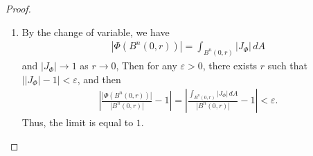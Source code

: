 \documentclass[11pt]{article}
\theoremstyle{definition}
\theoremstyle{definition}
\begin{document}
\begin{proof}
\begin{enumerate}[label=(\alph*)]
    \item By the change of variable, we have
    \begin{align*}
        \left|\Phi(B^n(0,r))\right| = \int_{B^n(0,r)} |J_\Phi|\, dA
    \end{align*}
    and $|J_\Phi| \to 1$ as $r \to 0$, Then for any $\varepsilon > 0$, there exists $r$ such that $\left||J_\Phi| - 1\right| < \varepsilon$, and then
    \begin{align*}
        \left|\frac{|\Phi(B^n(0,r))|}{|B^n(0,r)|} - 1\right| = \left|\frac{\int_{B^n(0,r)} |J_\Phi|\, dA}{|B^n(0,r)|} - 1\right|< \varepsilon.
    \end{align*}
    Thus, the limit is equal to $1$.
\end{enumerate}
\end{proof}


\medskip
\end{document}
